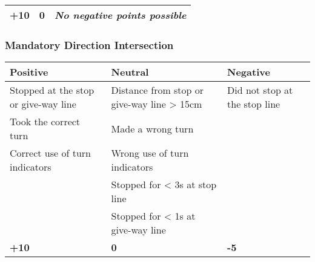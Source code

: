 {\begin{highlight}
\begin{table}[H]
\begin{tabularx}{\textwidth}{XXX}
				\topstrut
				\textbf{+10}                           & \textbf{0}                         & \textit{No negative points possible} \\
				\bottomrule
			\end{tabularx}
		\end{table}

		\subsubsection*{Mandatory Direction Intersection}
		\begin{table}[H]
			\begin{tabularx}{\textwidth}{XXX}
				\toprule
				\textbf{Positive}                    & \textbf{Neutral}                           & \textbf{Negative}                              \\
				\midrule
				Stopped at the stop or give-way line & Distance from stop or give-way line > 15cm & Did not stop at the stop line \footnotemark[3] \\
				Took the correct turn                & Made a wrong turn \footnotemark[4]         &                                                \\
				Correct use of turn indicators       & Wrong use of turn indicators               &                                                \\
				                                     & Stopped for < 3s at stop line              &                                                \\
				                                     & Stopped for < 1s at give-way line          &                                                \\
				\topstrut
				\textbf{+10}                         & \textbf{0}                                 & \textbf{-5}                                    \\
				\bottomrule
			\end{tabularx}
		\end{table}

		\newpage


\end{highlight}}
